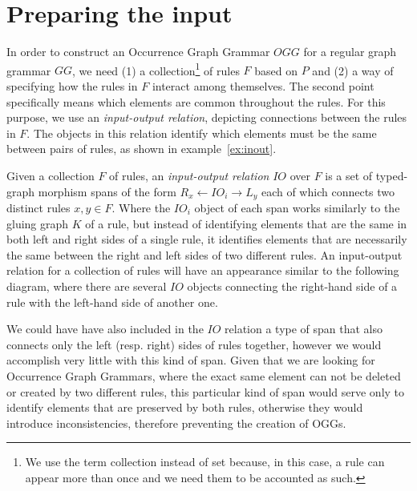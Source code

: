 \section{Preparing the input}

In order to construct an Occurrence Graph Grammar $OGG$ for a regular graph grammar $GG$, we need (1) a collection\footnote{ We use the term collection instead of set because, in this case, a rule can appear more than once and we need them to be accounted as such.} of rules $F$ based on $P$ and (2) a way of specifying how the rules in $F$ interact among themselves. The second point specifically means which elements are common throughout the rules. For this purpose, we use an \emph{input-output relation}, depicting connections between the rules in $F$. The objects in this relation identify which elements must be the same between pairs of rules, as shown in example~\ref{ex:inout}.

\begin{definition} Given a collection $F$ of rules, an \emph{input-output relation} $IO$ over $F$ is a set of typed-graph morphism spans of the form \mbox{$R_x \leftarrow IO_i \rightarrow L_y$} each of which connects two distinct rules $x,y \in F$. Where the $IO_i$ object of each span works similarly to the gluing graph $K$ of a rule, but instead of identifying elements that are the same in both left and right sides of a single rule, it identifies elements that are necessarily the same between the right and left sides of two different rules. An input-output relation for a collection of rules will have an appearance similar to the following diagram, where there are several $IO$ objects connecting the right-hand side of a rule with the left-hand side of another one.


\end{definition}

\begin{remark}We could have have also included in the $IO$ relation a type of span that also connects only the left (resp. right) sides of rules together, however we would accomplish very little with this kind of span. Given that we are looking for Occurrence Graph Grammars, where the exact same element can not be deleted or created by two different rules, this particular kind of span would serve only to identify elements that are preserved by both rules, otherwise they would introduce inconsistencies, therefore preventing the creation of OGGs.
\end{remark}

